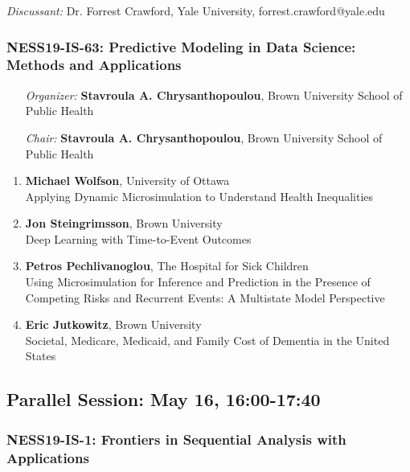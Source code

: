 \emph{Discussant:} Dr. Forrest Crawford, Yale University, forrest.crawford@yale.edu

\subsubsection*{NESS19-IS-63: Predictive Modeling in Data Science: Methods and Applications}

\begin{enumerate}[align=left]
\item [\emph{Organizer:}] \textbf{Stavroula A. Chrysanthopoulou}, Brown University School of Public Health
\item [\emph{Chair:}] \textbf{Stavroula A. Chrysanthopoulou}, Brown University School of Public Health
\end{enumerate}

\begin{enumerate}
\item \textbf{Michael Wolfson}, University of Ottawa \\
Applying Dynamic Microsimulation to Understand Health Inequalities
\item \textbf{Jon Steingrimsson}, Brown University \\
Deep Learning with Time-to-Event Outcomes
\item \textbf{Petros Pechlivanoglou}, The Hospital for Sick Children \\
Using Microsimulation for Inference and Prediction in the Presence of Competing Risks and Recurrent Events: A Multistate Model Perspective
\item \textbf{Eric Jutkowitz}, Brown University \\
Societal, Medicare, Medicaid, and Family Cost of Dementia in the United States
\end{enumerate}

\subsection*{Parallel Session: May 16, 16:00-17:40}

\subsubsection*{NESS19-IS-1: Frontiers in Sequential Analysis with Applications}

